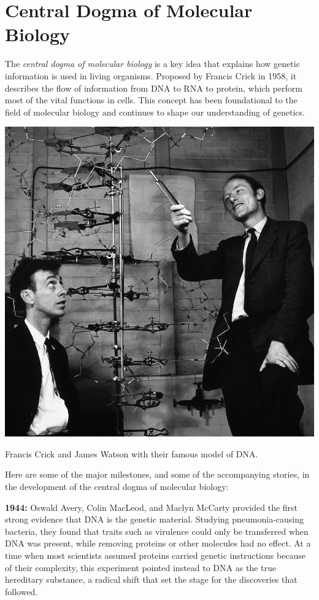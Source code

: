 \chapter{Central Dogma of Molecular Biology}

The {\em central dogma of molecular biology} is a key idea that explains how genetic information is used in living organisms. Proposed by Francis Crick in 1958, it describes the flow of information from DNA to RNA to protein, which perform most of the vital functions in cells. This concept has been foundational to the field of molecular biology and continues to shape our understanding of genetics.

\begin{marginfigure}
    \includegraphics{figs/history/watson-crick-dna.jpeg}
    \caption[6pt]{Francis Crick and James Watson with their famous model of DNA.}
    \label{fig:watson-crick-dna}
\end{marginfigure}

Here are some of the major milestones, and some of the accompanying stories, in the development of the central dogma of molecular biology:

\medskip\noindent\textbf{1944:} Oswald Avery, Colin MacLeod, and Maclyn McCarty provided the first strong evidence that DNA is the genetic material. Studying pneumonia-causing bacteria, they found that traits such as virulence could only be transferred when DNA was present, while removing proteins or other molecules had no effect. At a time when most scientists assumed proteins carried genetic instructions because of their complexity, this experiment pointed instead to DNA as the true hereditary substance, a radical shift that set the stage for the discoveries that followed.


